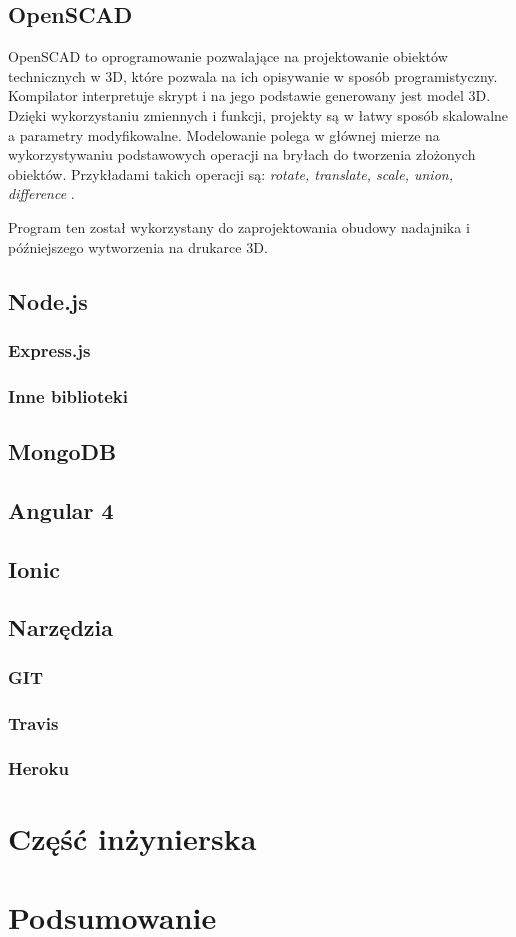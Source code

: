\documentclass[eng,printmode]{mgr}
\begin{document}
\section{OpenSCAD}
OpenSCAD to oprogramowanie pozwalające na projektowanie obiektów technicznych w 3D, które pozwala na ich opisywanie w sposób programistyczny. Kompilator interpretuje skrypt i na jego podstawie generowany jest model 3D. Dzięki wykorzystaniu zmiennych i funkcji, projekty są w łatwy sposób skalowalne a parametry modyfikowalne. Modelowanie polega w głównej mierze na wykorzystywaniu podstawowych operacji na bryłach do tworzenia złożonych obiektów. Przykładami takich operacji są: \textit{rotate, translate, scale, union, difference} \cite{openscad}.

Program ten został wykorzystany do zaprojektowania obudowy nadajnika i późniejszego wytworzenia na drukarce 3D.


\section{Node.js}


\subsection{Express.js}
\subsection{Inne biblioteki}
\section{MongoDB}
\section{Angular 4}
\section{Ionic}
\section{Narzędzia}
\subsection{GIT}
\subsection{Travis}
\subsection{Heroku}

\chapter{Część inżynierska}
\cite{Node.js}

\chapter{Podsumowanie}

 
\end{document}
